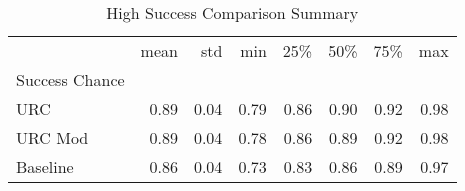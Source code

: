 \begin{table}
\caption{High Success Comparison Summary}
\begin{tabular}{lrrrrrrr}
\toprule
 & mean & std & min & 25\% & 50\% & 75\% & max \\
Success Chance &  &  &  &  &  &  &  \\
\midrule
URC & 0.89 & 0.04 & 0.79 & 0.86 & 0.90 & 0.92 & 0.98 \\
URC Mod & 0.89 & 0.04 & 0.78 & 0.86 & 0.89 & 0.92 & 0.98 \\
Baseline & 0.86 & 0.04 & 0.73 & 0.83 & 0.86 & 0.89 & 0.97 \\
\bottomrule
\end{tabular}
\end{table}
